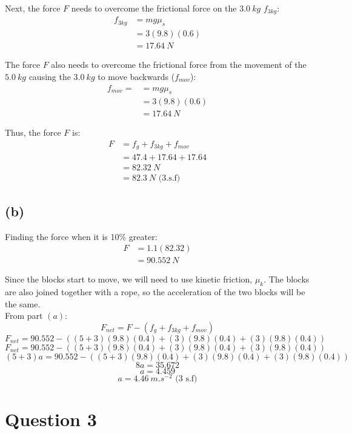 \documentclass[11pt]{article}
\begin{document}
Next, the force \(F\) needs to overcome the frictional force on the \(\qty{3.0}{\unit{kg}}\) \(f_{3kg}\):
\begin{align*}
f_{3kg} &= mg \mu_s \\
&= 3(9.8)(0.6) \\
&= \qty{17.64}{\unit{N}}
\end{align*}

The force \(F\) also needs to overcome the frictional force from the movement of the \(\qty{5.0}{\unit{kg}}\) causing the \(\qty{3.0}{\unit{kg}}\) to move backwards (\(f_{mov}\)):
\begin{align*}
f_{mov} = &= mg \mu_s \\
&= 3(9.8)(0.6) \\
&= \qty{17.64}{\unit{N}}
\end{align*}

Thus, the force \(F\) is:
\begin{align*}
F &= f_g + f_{3kg} + f_{mov} \\
&= 47.4 + 17.64 + 17.64 \\
&= \qty{82.32}{\unit{N}} \\
&= \qty{82.3}{\unit{N}} \text{ (3.s.f)}
\end{align*}

\newpage

\subsection{(b)}
\label{sec:org70c4dde}
Finding the force when it is 10\% greater:
\begin{align*}
F &= 1.1(82.32) \\
&= \qty{90.552}{\unit{N}}
\end{align*}

Since the blocks start to move, we will need to use kinetic friction, \(\mu_k\). The blocks are also joined together with a rope, so the acceleration of the two blocks will be the same.
\\[0pt]

From part \((a)\):
\[F_{net} = F - (f_g + f_{3kg} + f_{mov})\]
\[F_{net} = 90.552 - ((5 + 3)(9.8)(0.4) + (3)(9.8)(0.4) + (3)(9.8)(0.4))\]
\[F_{net} = 90.552 - ((5 + 3)(9.8)(0.4) + (3)(9.8)(0.4) + (3)(9.8)(0.4))\]
\[(5 + 3)a = 90.552 - ((5 + 3)(9.8)(0.4) + (3)(9.8)(0.4) + (3)(9.8)(0.4))\]
\[8a = 35.672\]
\[a = 4.459\]
\[a = \qty{4.46}{\unit{m.s^{-2}}} \text{ (3 s.f)}\]

\section{Question 3}
\label{sec:orge33dc93}
\end{document}

